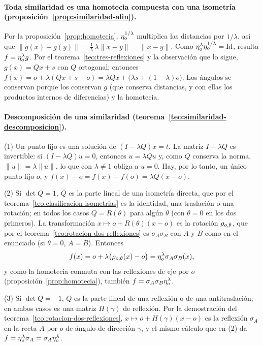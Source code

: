 \paragraph{Toda similaridad es una homotecia compuesta con una isometría (proposición~\ref{prop:similaridad-afin}).}
\begin{demostracion}
Por la proposición~\ref{prop:homotecia}, \(\eta_{o}^{1/\lambda}\) multiplica las distancias por
\(1/\lambda\), así que
\(\lVert g(x)-g(y)\rVert=\frac1\lambda\,\lambda\lVert x-y\rVert=\lVert x-y\rVert\). Como
\(\eta_{o}^{\lambda}\eta_{o}^{1/\lambda}=\operatorname{Id}\), resulta \(f=\eta_{o}^{\lambda}g\).
Por el teorema~\ref{teo:tres-reflexiones} y la observación que lo sigue, \(g(x)=Qx+s\) con
\(Q\) ortogonal; entonces \(f(x)=o+\lambda(Qx+s-o)=\lambda Qx+\bigl(\lambda s+(1-\lambda)o\bigr)\).
Los ángulos se conservan porque los conservan \(g\) (que conserva distancias, y con ellas los
productos internos de diferencias) y la homotecia.
\end{demostracion}

\paragraph{Descomposición de una similaridad (teorema~\ref{teo:similaridad-descomposicion}).}
\begin{demostracion}
(1) Un punto fijo es una solución de \((I-\lambda Q)x=t\). La matriz \(I-\lambda Q\) es
invertible: si \((I-\lambda Q)u=0\), entonces \(u=\lambda Qu\) y, como \(Q\) conserva la norma,
\(\lVert u\rVert=\lambda\lVert u\rVert\), lo que con \(\lambda\neq1\) obliga a \(u=0\). Hay, por
lo tanto, un único punto fijo \(o\), y \(f(x)-o=f(x)-f(o)=\lambda Q(x-o)\).

(2) Si \(\det Q=1\), \(Q\) es la parte lineal de una isometría directa, que por el
teorema~\ref{teo:clasificacion-isometrias} es la identidad, una traslación o una rotación; en
todos los casos \(Q=R(\theta)\) para algún \(\theta\) (con \(\theta=0\) en los dos primeros). La
transformación \(x\mapsto o+R(\theta)(x-o)\) es la rotación \(\rho_{o,\theta}\), que por el
teorema~\ref{teo:rotacion-dos-reflexiones} es \(\sigma_{A}\sigma_{B}\) con \(A\) y \(B\) como en
el enunciado (si \(\theta=0\), \(A=B\)). Entonces
\[
  f(x)=o+\lambda\bigl(\rho_{o,\theta}(x)-o\bigr)=\eta_{o}^{\lambda}\sigma_{A}\sigma_{B}(x),
\]
y como la homotecia conmuta con las reflexiones de eje por \(o\)
(proposición~\ref{prop:homotecia}), también \(f=\sigma_{A}\sigma_{B}\eta_{o}^{\lambda}\).

(3) Si \(\det Q=-1\), \(Q\) es la parte lineal de una reflexión o de una antitraslación; en
ambos casos es una matriz \(H(\gamma)\) de reflexión. Por la demostración del
teorema~\ref{teo:rotacion-dos-reflexiones}, \(x\mapsto o+H(\gamma)(x-o)\) es la reflexión
\(\sigma_{A}\) en la recta \(A\) por \(o\) de ángulo de dirección \(\gamma\), y el mismo cálculo
que en (2) da \(f=\eta_{o}^{\lambda}\sigma_{A}=\sigma_{A}\eta_{o}^{\lambda}\).
\end{demostracion}

